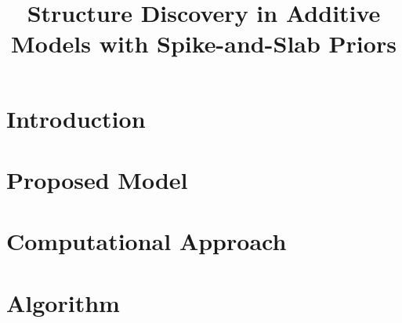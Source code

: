 \documentclass[12pt]{article}
\title{Structure Discovery in Additive Models with Spike-and-Slab Priors}
\begin{document}
\def\by{\mathbf{y}}
\def\bY{\mathbf{Y}}
\def\bx{\mathbf{x}}
\def\bX{\mathbf{X}}

\def\bz{\bm{z}}

\def\bphi{\boldsymbol{\phi}}
\def\bpsi{\boldsymbol{\psi}}
\def\br{\mathbf{r}} %
\def\bR{\mathbf{R}}%
\def\bg{\mathbf{g}}
\def\balpha{\boldsymbol{\alpha}}
\def\bbeta{\boldsymbol{\beta}}
\def\bB{\mathbf{B}}
\def\bphi{\boldsymbol{\phi}}
\def\bPhi{\boldsymbol{\Phi}}
\def\bpsi{\boldsymbol{\psi}}
\def\bPsi{\boldsymbol{\Psi}}


\def\bgamma{\boldsymbol{\gamma}} %
\def\btheta{\boldsymbol{\theta}} %
\def\tilbtheta{\tilde{\btheta}}
\def\R{\mathbb{R}}
\def\P{\mathbb{P}}
\def\E{\mathbb{E}}
\def\N{\mathcal{N}}



\newpage

\onehalfspacing

\section{Introduction}
\label{sec:introduction}



\section{Proposed Model}
\label{sec:proposed_model}


\section{Computational Approach}
\label{sec:computation}


\newpage
\appendix
\section{Algorithm}
\label{app:algorithm}


\newpage

\end{document}
